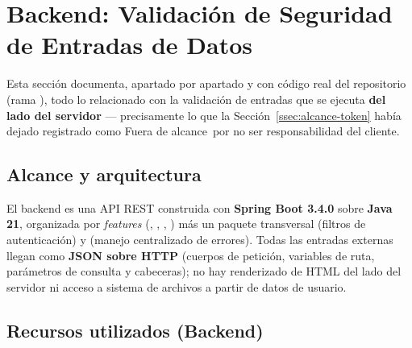 \documentclass[11pt,a4paper]{article}
\newcommand{\Fuera}{\textcolor{fueraColor}{Fuera de alcance}}
\begin{document}
\newpage
\section{Backend: Validación de Seguridad de Entradas de Datos}
\label{sec:backend-servidor}

Esta sección documenta, apartado por apartado y con código real del repositorio \texttt{} (rama \texttt{}), todo lo relacionado con la validación de entradas que se ejecuta \textbf{del lado del servidor} --- precisamente lo que la Sección~\ref{ssec:alcance-token} había dejado registrado como \Fuera\ por no ser responsabilidad del cliente.

\subsection{Alcance y arquitectura}

El backend es una API REST construida con \textbf{Spring Boot 3.4.0} sobre \textbf{Java 21}, organizada por \emph{features} (\texttt{}, \texttt{}, \texttt{}, \texttt{}) más un paquete transversal \texttt{} (filtros de autenticación) y \texttt{} (manejo centralizado de errores). Todas las entradas externas llegan como \textbf{JSON sobre HTTP} (cuerpos de petición, variables de ruta, parámetros de consulta y cabeceras); no hay renderizado de HTML del lado del servidor ni acceso a sistema de archivos a partir de datos de usuario.

\subsection{Recursos utilizados (Backend)}
\end{document}
